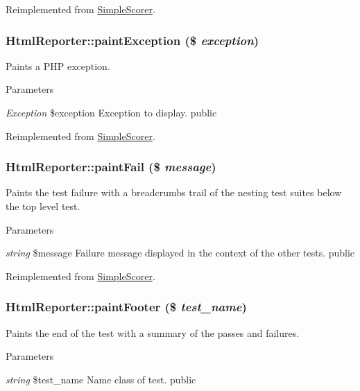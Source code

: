 Reimplemented from \hyperlink{class_simple_scorer_ac33eeacd9e121f39874f95eec7219b88}{SimpleScorer}.\hypertarget{class_html_reporter_a13348c829f8853d8ad061b6b6112f5b8}{
\subsubsection[{paintException}]{\setlength{\rightskip}{0pt plus 5cm}HtmlReporter::paintException (\$ {\em exception})}}
\label{class_html_reporter_a13348c829f8853d8ad061b6b6112f5b8}
Paints a PHP exception. 
\begin{DoxyParams}{Parameters}
\item[{\em Exception}]\$exception Exception to display.  public \end{DoxyParams}


Reimplemented from \hyperlink{class_simple_scorer_af85813652ea0ec8aca7261267c121f6c}{SimpleScorer}.\hypertarget{class_html_reporter_a5e19e29324ad91541a15586032744136}{
\subsubsection[{paintFail}]{\setlength{\rightskip}{0pt plus 5cm}HtmlReporter::paintFail (\$ {\em message})}}
\label{class_html_reporter_a5e19e29324ad91541a15586032744136}
Paints the test failure with a breadcrumbs trail of the nesting test suites below the top level test. 
\begin{DoxyParams}{Parameters}
\item[{\em string}]\$message Failure message displayed in the context of the other tests.  public \end{DoxyParams}


Reimplemented from \hyperlink{class_simple_scorer_a25656682bd645cf156f3a2a87893d8b3}{SimpleScorer}.\hypertarget{class_html_reporter_a7397e35688d992bc2cfb17c973a980b4}{
\subsubsection[{paintFooter}]{\setlength{\rightskip}{0pt plus 5cm}HtmlReporter::paintFooter (\$ {\em test\_\-name})}}
\label{class_html_reporter_a7397e35688d992bc2cfb17c973a980b4}
Paints the end of the test with a summary of the passes and failures. 
\begin{DoxyParams}{Parameters}
\item[{\em string}]\$test\_\-name Name class of test.  public \end{DoxyParams}


